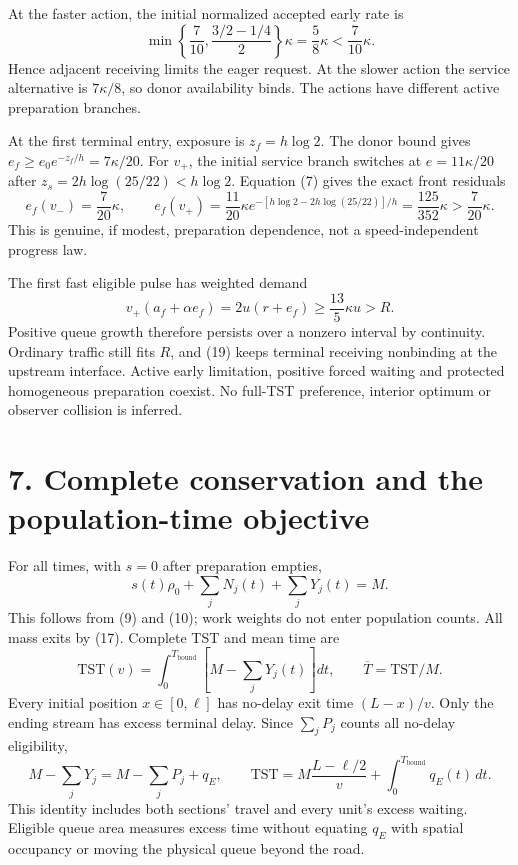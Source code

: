 \documentclass[11pt,a4paper]{article}
\begin{document}
At the faster action, the initial normalized accepted early rate is
\[
 \min\left\{\frac7{10},\frac{3/2-1/4}{2}\right\}\kappa
 =\frac58\kappa<\frac7{10}\kappa.
 \tag{20}
\]
Hence adjacent receiving limits the eager request. At the slower
action the service alternative is $7\kappa/8$, so donor availability binds.
The actions have different active preparation branches.

At the first terminal entry, exposure is $z_f=h\log2$.
The donor bound gives $e_f\geq e_0e^{-z_f/h}=7\kappa/20$.
For $v_+$, the initial service branch switches at
$e=11\kappa/20$ after $z_s=2h\log(25/22)<h\log2$.
Equation (7) gives the exact front residuals
\[
 e_f(v_-)=\frac7{20}\kappa,\qquad
 e_f(v_+)=\frac{11}{20}\kappa
     e^{-[h\log2-2h\log(25/22)]/h}
     =\frac{125}{352}\kappa>\frac7{20}\kappa.
 \tag{21}
\]
This is genuine, if modest, preparation dependence, not a speed-independent
progress law.

The first fast eligible pulse has weighted demand
\[
 v_+(a_f+\alpha e_f)=2u(r+e_f)
 \geq\frac{13}{5}\kappa u>R.
 \tag{22}
\]
Positive queue growth therefore persists over a nonzero interval by
continuity. Ordinary traffic still fits $R$, and (19) keeps terminal
receiving nonbinding at the upstream interface. Active early limitation,
positive forced waiting and protected homogeneous preparation coexist.
No full-TST preference, interior optimum or observer collision is inferred.

\section*{7. Complete conservation and the population-time objective}
For all times, with $s=0$ after preparation empties,
\[
 s(t)\rho_0+\sum_jN_j(t)+\sum_jY_j(t)=M .
 \tag{23}
\]
This follows from (9) and (10); work weights do not enter population counts.
All mass exits by (17). Complete TST and mean time are
\[
 \mathrm{TST}(v)=\int_0^{T_{\mathrm{bound}}}
       \left[M-\sum_jY_j(t)\right]dt,\qquad
 \overline T=\mathrm{TST}/M.
 \tag{24}
\]
Every initial position $x\in[0,\ell]$ has no-delay exit time $(L-x)/v$.
Only the ending stream has excess terminal delay. Since
$\sum_jP_j$ counts all no-delay eligibility,
\[
 M-\sum_jY_j=M-\sum_jP_j+q_E,\qquad
 \mathrm{TST}=M\frac{L-\ell/2}{v}+\int_0^{T_{\mathrm{bound}}}q_E(t)\,dt.
 \tag{25}
\]
This identity includes both sections' travel and every unit's excess waiting.
Eligible queue area measures excess time without equating $q_E$ with spatial
occupancy or moving the physical queue beyond the road.
\end{document}
